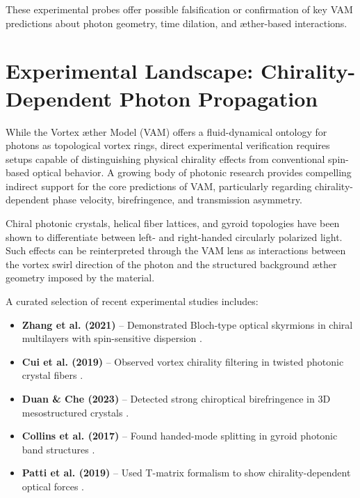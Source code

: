         These experimental probes offer possible falsification or confirmation of key VAM predictions about photon geometry, time dilation, and æther-based interactions.

\section{Experimental Landscape: Chirality-Dependent Photon Propagation}\label{sec:chirality-exp}

        While the Vortex \ae ther Model (VAM) offers a fluid-dynamical ontology for photons as topological vortex rings, direct experimental verification requires setups capable of distinguishing physical chirality effects from conventional spin-based optical behavior. A growing body of photonic research provides compelling indirect support for the core predictions of VAM, particularly regarding chirality-dependent phase velocity, birefringence, and transmission asymmetry.

        Chiral photonic crystals, helical fiber lattices, and gyroid topologies have been shown to differentiate between left- and right-handed circularly polarized light. Such effects can be reinterpreted through the VAM lens as interactions between the vortex swirl direction of the photon and the structured background æther geometry imposed by the material.

        A curated selection of recent experimental studies includes:

        \begin{itemize}
            \item \textbf{Zhang et al. (2021)} – Demonstrated Bloch-type optical skyrmions in chiral multilayers with spin-sensitive dispersion \cite{zhang2021skyrmions}.
            \item \textbf{Cui et al. (2019)} – Observed vortex chirality filtering in twisted photonic crystal fibers \cite{cui2019vortex}.
            \item \textbf{Duan \& Che (2023)} – Detected strong chiroptical birefringence in 3D mesostructured crystals \cite{duan2023chiral}.
            \item \textbf{Collins et al. (2017)} – Found handed-mode splitting in gyroid photonic band structures \cite{collins2017gyroid}.
            \item \textbf{Patti et al. (2019)} – Used T-matrix formalism to show chirality-dependent optical forces \cite{patti2019tweezers}.
        \end{itemize}

